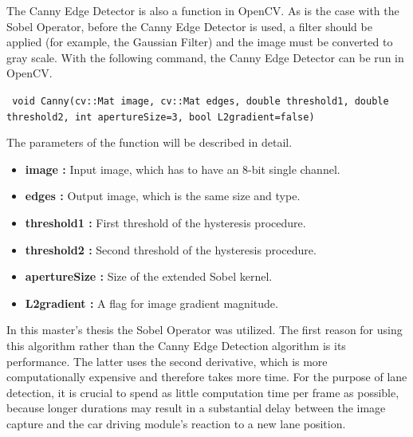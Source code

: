 The Canny Edge Detector is also a function in OpenCV. As is the case with the Sobel Operator, before the Canny Edge Detector is used, a filter should be applied (for example, the Gaussian Filter) and the image must be converted to gray scale. With the following command, the Canny Edge Detector can be run in OpenCV.\cite{Canny_Edge_Detector3}

 \begin{center}
 
\texttt{ void Canny(cv::Mat image, cv::Mat edges, double threshold1, double threshold2, int apertureSize=3, bool L2gradient=false)}

 \end{center}
 
 The parameters of the function will be described in detail.\cite{Canny_Edge_Detector3}
 
     \begin{itemize}

\item \textbf{image : }Input image, which has to have an 8-bit single channel.

\item \textbf{edges : }Output image, which is the same size and type.

\item \textbf{threshold1 : }First threshold of the hysteresis procedure.

\item \textbf{threshold2 : }Second threshold of the hysteresis procedure.

\item \textbf{apertureSize : }Size of the extended Sobel kernel.

\item \textbf{L2gradient : }A flag for image gradient magnitude.

\end{itemize}
 
%



In this master's thesis the Sobel Operator was utilized. The first reason for using this algorithm rather than the Canny Edge Detection algorithm is its performance. The latter uses the second derivative, which is more computationally expensive and therefore takes more time. For the purpose of lane detection, it is crucial to spend as little computation time per frame as possible, because longer durations may result in a substantial delay between the image capture and the car driving module's reaction to a new lane position. 




